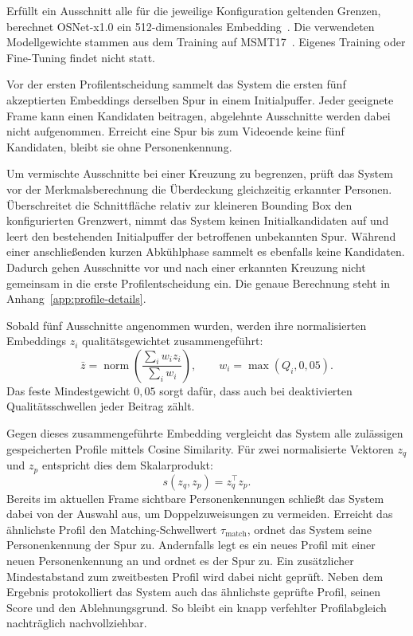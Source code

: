 \documentclass[runningheads,a4paper]{llncs}
\begin{document}
Erfüllt ein Ausschnitt alle für die jeweilige Konfiguration geltenden Grenzen, berechnet OSNet-x1.0 ein 512-dimensionales Embedding~\cite{zhou2019osnet}. Die verwendeten Modellgewichte stammen aus dem Training auf MSMT17~\cite{torchreid-modelzoo}. Eigenes Training oder Fine-Tuning findet nicht statt.

Vor der ersten Profilentscheidung sammelt das System die ersten fünf akzeptierten Embeddings derselben Spur in einem Initialpuffer. Jeder geeignete Frame kann einen Kandidaten beitragen, abgelehnte Ausschnitte werden dabei nicht aufgenommen. Erreicht eine Spur bis zum Videoende keine fünf Kandidaten, bleibt sie ohne Personenkennung.

Um vermischte Ausschnitte bei einer Kreuzung zu begrenzen, prüft das System vor der Merkmalsberechnung die Überdeckung gleichzeitig erkannter Personen. Überschreitet die Schnittfläche relativ zur kleineren Bounding Box den konfigurierten Grenzwert, nimmt das System keinen Initialkandidaten auf und leert den bestehenden Initialpuffer der betroffenen unbekannten Spur. Während einer anschlie{\ss}enden kurzen Abkühlphase sammelt es ebenfalls keine Kandidaten. Dadurch gehen Ausschnitte vor und nach einer erkannten Kreuzung nicht gemeinsam in die erste Profilentscheidung ein. Die genaue Berechnung steht in Anhang~\ref{app:profile-details}.

Sobald fünf Ausschnitte angenommen wurden, werden ihre normalisierten Embeddings $z_i$ qualitätsgewichtet zusammengeführt:
\begin{equation}
\bar z=\operatorname{norm}\left(\frac{\sum_i w_i z_i}{\sum_i w_i}\right),
\qquad w_i=\max(Q_i,0{,}05).
\label{eq:fusion}
\end{equation}
Das feste Mindestgewicht $0{,}05$ sorgt dafür, dass auch bei deaktivierten Qualitätsschwellen jeder Beitrag zählt.

Gegen dieses zusammengeführte Embedding vergleicht das System alle zulässigen gespeicherten Profile mittels
Cosine Similarity. Für zwei normalisierte Vektoren $z_q$ und $z_p$ entspricht dies dem Skalarprodukt:
\begin{equation}
s(z_q,z_p)=z_q^\top z_p.
\label{eq:cosine}
\end{equation}
Bereits im aktuellen Frame sichtbare Personenkennungen schlie{\ss}t das System dabei von der Auswahl aus, um Doppelzuweisungen zu vermeiden. Erreicht das ähnlichste Profil den Matching-Schwellwert $\tau_{\mathrm{match}}$, ordnet das System seine Personenkennung der Spur zu. Andernfalls legt es ein neues Profil mit einer neuen Personenkennung an und ordnet es der Spur zu. Ein zusätzlicher Mindestabstand zum zweitbesten Profil wird dabei nicht geprüft. Neben dem Ergebnis protokolliert das System auch das ähnlichste geprüfte Profil, seinen Score und den Ablehnungsgrund. So bleibt ein knapp verfehlter Profilabgleich nachträglich nachvollziehbar.
\end{document}
